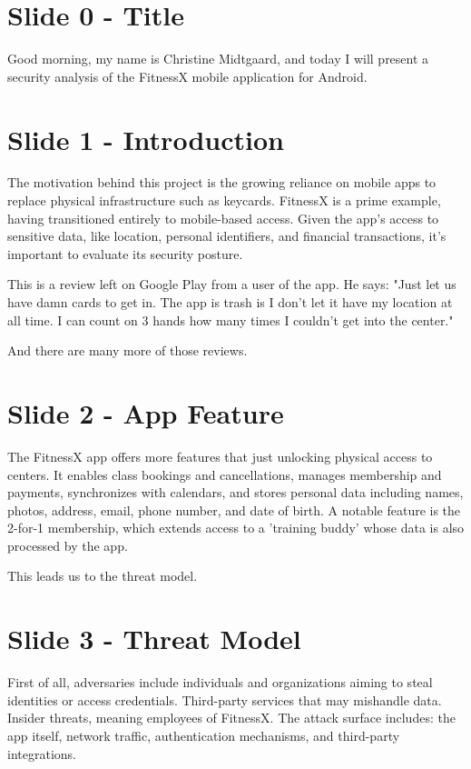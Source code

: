 \documentclass[12pt,a4paper]{article}
\begin{document}
\section*{Slide 0 - Title}

Good morning, my name is Christine Midtgaard, and today I will present a security analysis of the FitnessX mobile application for Android. 

\section*{Slide 1 - Introduction}
The motivation behind this project is the growing reliance on mobile apps to replace physical infrastructure such as keycards. FitnessX is a prime example, having transitioned entirely to mobile-based access. Given the app's access to sensitive data, like location, personal identifiers, and financial transactions, it's important to evaluate its security posture.

This is a review left on Google Play from a user of the app. He says: "Just let us have damn cards to get in. The app is trash is I don't let it have my location at all time. I can count on 3 hands how many times I couldn't get into the center."

And there are many more of those reviews.

\section*{Slide 2 - App Feature}
The FitnessX app offers more features that just unlocking physical access to centers. It enables class bookings and cancellations, manages membership and payments, synchronizes with calendars, and stores personal data including names, photos, address, email, phone number, and date of birth. A notable feature is the 2-for-1 membership, which extends access to a 'training buddy' whose data is also processed by the app. 

This leads us to the threat model.

\section*{Slide 3 - Threat Model}
First of all, adversaries include individuals and organizations aiming to steal identities or access credentials. Third-party services that may mishandle data. Insider threats, meaning employees of FitnessX. The attack surface includes: the app itself, network traffic, authentication mechanisms, and third-party integrations.
\end{document}
